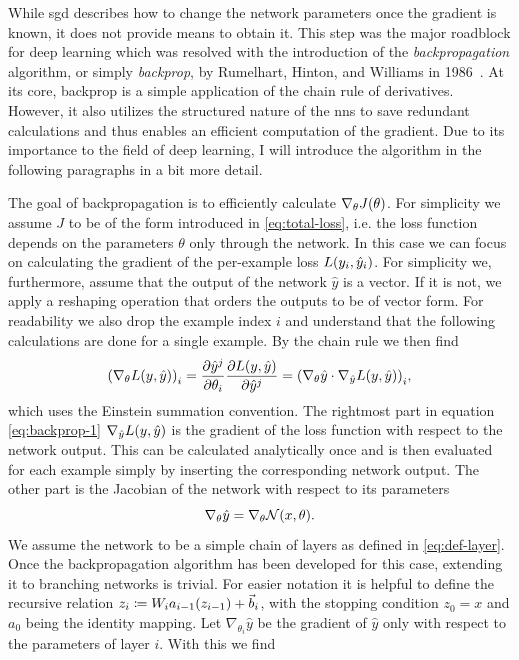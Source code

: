 While \acrshort{sgd} describes how to change the network parameters once the gradient is known, it does not provide means to obtain it. This step was the major roadblock for deep learning which was resolved with the introduction of the \emph{backpropagation} algorithm, or simply \emph{backprop}, by Rumelhart, Hinton, and Williams in 1986~\cite{rumelhart1985:aaa}. At its core, backprop is a simple application of the chain rule of derivatives. However, it also utilizes the structured nature of the \acrshort{nn}s to save redundant calculations and thus enables an efficient computation of the gradient. Due to its importance to the field of deep learning, I will introduce the algorithm in the following paragraphs in a bit more detail.

The goal of backpropagation is to efficiently calculate $\nabla_\theta J{\left( \theta \right)}$. For simplicity we assume $J$ to be of the form introduced in \eqref{eq:total-loss}, i.e. the loss function depends on the parameters $\theta$ only through the network. In this case we can focus on calculating the gradient of the per-example loss $L{\left( y_i, \hat{y}_i \right)}$. For simplicity we, furthermore, assume that the output of the network $\hat{y}$ is a vector. If it is not, we apply a reshaping operation that orders the outputs to be of vector form. For readability we also drop the example index $i$ and understand that the following calculations are done for a single example. By the chain rule we then find~\cite{Goodfellow:2016:DNN}%
\begin{equation}\label{eq:backprop-1}
{\left( \nabla_\theta L{\left( y, \hat{y} \right)} \right)}_i = \frac{\partial \hat{y}^j}{\partial\theta_i} \frac{\partial L{\left( y, \hat{y} \right)}}{\partial \hat{y}^j}={\left( \nabla_\theta \hat{y}\cdot \nabla_{\hat{y}} L{\left( y, \hat{y} \right)} \right)}_i,
\end{equation}
which uses the Einstein summation convention. The rightmost part in equation \eqref{eq:backprop-1} $\nabla_{\hat{y}} L{\left( y, \hat{y} \right)}$ is the gradient of the loss function with respect to the network output. This can be calculated analytically once and is then evaluated for each example simply by inserting the corresponding network output. The other part is the Jacobian of the network with respect to its parameters
\begin{equation}
\nabla_\theta \hat{y} = \nabla_\theta \mathcal{N}{\left( x, \theta \right)}.
\end{equation}
We assume the network to be a simple chain of layers as defined in \eqref{eq:def-layer}. Once the backpropagation algorithm has been developed for this case, extending it to branching networks is trivial. For easier notation it is helpful to define the recursive relation $z_i\coloneqq W_i a_{i-1}{\left( z_{i-1} \right)}+\vec{b}_i$, with the stopping condition $z_0 = x$ and $a_0$ being the identity mapping. Let $\nabla_{\theta_i}\hat{y}$ be the gradient of $\hat{y}$ only with respect to the parameters of layer $i$. With this we find
